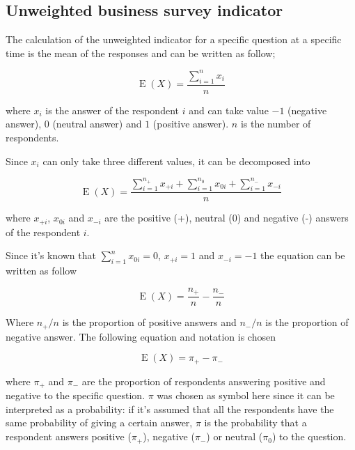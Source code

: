 \documentclass[12pt,a4paper,oneside]{book}
\DeclareMathOperator{\E}{E}
\begin{document}
\subsection{Unweighted business survey indicator}

The calculation of the unweighted indicator for a specific question at a specific time is the mean of the responses and can be written as follow;

\begin{equation}
    \E(X) = \frac{ \sum_{i=1}^n x_i}{n}
\end{equation} 

where 
$x_i$ is the answer of the respondent $i$ and can take value $-1$ (negative answer), $0$ (neutral answer) and $1$ (positive answer). 
$n$ is the number of respondents.

Since $x_i$ can only take three different values, it can be decomposed into

\begin{equation}
    \E(X) = \frac{ \sum_{i=1}^{n_+} x_{+i} + \sum_{i=1}^{n_0} x_{0i} + \sum_{i=1}^{n_-} x_{-i}}{n}
\end{equation} 


where 
$x_{+i}$, $x_{0i}$ and $x_{-i}$ are the positive (+), neutral (0) and negative (-) answers of the respondent $i$.

Since it's known that $\sum_{i=1}^n x_{0i} = 0$, $x_{+i} = 1$ and $x_{-i} = -1$ the equation can be written as follow

\begin{equation}
    \E(X) = \frac{n_+}{n}  - \frac{n_-}{n}
\end{equation} 

Where ${n_+}/{n}$ is the proportion of positive answers and ${n_-}/{n}$ is the proportion of negative answer. The following equation and notation is chosen

\begin{equation}
    \E(X) = \pi_+ - \pi_-  \label{eq: BSI Unweighted}
\end{equation}

where $\pi_+$ and $\pi_-$ are the proportion of respondents answering positive and negative to the specific question.
$\pi$ was chosen as symbol here since it can be interpreted as a probability: if it's assumed that all the respondents have the same probability of giving a certain answer, $\pi$ is the probability that a respondent answers positive ($\pi_+$), negative ($\pi_-$) or neutral ($\pi_0$) to the question. 
\end{document}
